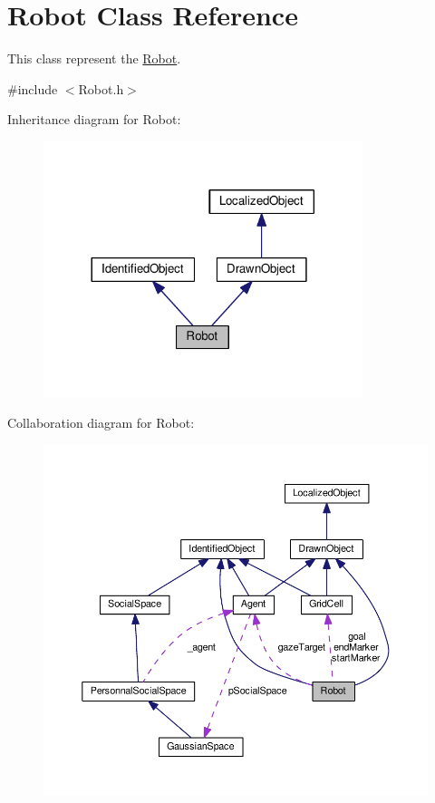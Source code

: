 \hypertarget{classRobot}{}\section{Robot Class Reference}
\label{classRobot}


This class represent the \hyperlink{classRobot}{Robot}.  




{\ttfamily \#include $<$Robot.\+h$>$}



Inheritance diagram for Robot\+:\nopagebreak
\begin{figure}[H]
\begin{center}
\leavevmode
\includegraphics[width=264pt]{classRobot__inherit__graph}
\end{center}
\end{figure}


Collaboration diagram for Robot\+:\nopagebreak
\begin{figure}[H]
\begin{center}
\leavevmode
\includegraphics[width=350pt]{classRobot__coll__graph}
\end{center}
\end{figure}
